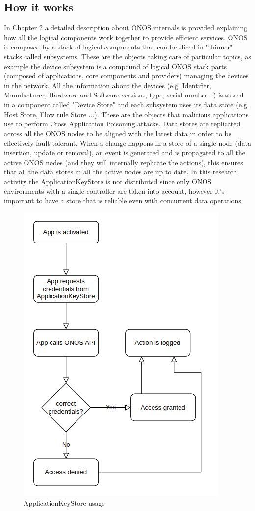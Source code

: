 \subsection{How it works}
In Chapter 2 a detailed description about ONOS internals is provided explaining how all the logical components work together to provide efficient services. ONOS is composed by a stack of logical components that can be sliced in "thinner" stacks called subsystems. These are the objects taking care of particular topics, as example the device subsystem is a compound of logical ONOS stack parts (composed of applications, core components and providers) managing the devices in the network. All the information about the devices (e.g. Identifier, Manufacturer, Hardware and Software versions, type, serial number...) is stored in a component called "Device Store" and each subsystem uses its data store (e.g. Host Store, Flow rule Store ...). These are the objects that malicious applications use to perform Cross Application Poisoning attacks. Data stores are replicated across all the ONOS nodes to be aligned with the latest data in order to be effectively fault tolerant. When a change happens in a store of a single node (data insertion, update or removal), an event is generated and is propagated to all the active ONOS nodes (and they will internally replicate the actions), this ensures that all the data stores in all the active nodes are up to date. In this research activity the ApplicationKeyStore is not distributed since only ONOS environments with a single controller are taken into account, however it's important to have a store that is reliable even with concurrent data operations.

\begin{figure}[h]
\caption{ApplicationKeyStore usage}
\label{fig:aks}
\includegraphics[width=0.6
\textwidth]{resources/Chapter-3/aks.png}
\centering
\end{figure}

